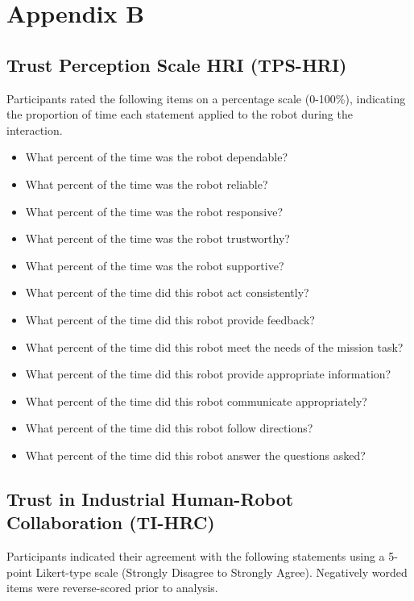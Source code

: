\documentclass[
]{article}
\providecommand{\tightlist}{%
  \setlength{\itemsep}{0pt}\setlength{\parskip}{0pt}}
\begin{document}
\section{Appendix B}\label{sec-appendix-b}

\subsection{Trust Perception Scale HRI
(TPS-HRI)}\label{trust-perception-scale-hri-tps-hri}

Participants rated the following items on a percentage scale (0-100\%),
indicating the proportion of time each statement applied to the robot
during the interaction.

\begin{itemize}
\tightlist
\item
  What percent of the time was the robot dependable?
\item
  What percent of the time was the robot reliable?
\item
  What percent of the time was the robot responsive?
\item
  What percent of the time was the robot trustworthy?
\item
  What percent of the time was the robot supportive?
\item
  What percent of the time did this robot act consistently?
\item
  What percent of the time did this robot provide feedback?
\item
  What percent of the time did this robot meet the needs of the mission
  task?
\item
  What percent of the time did this robot provide appropriate
  information?
\item
  What percent of the time did this robot communicate appropriately?
\item
  What percent of the time did this robot follow directions?
\item
  What percent of the time did this robot answer the questions asked?
\end{itemize}

\subsection{Trust in Industrial Human-Robot Collaboration
(TI-HRC)}\label{trust-in-industrial-human-robot-collaboration-ti-hrc}

Participants indicated their agreement with the following statements
using a 5-point Likert-type scale (Strongly Disagree to Strongly Agree).
Negatively worded items were reverse-scored prior to analysis.
\end{document}
